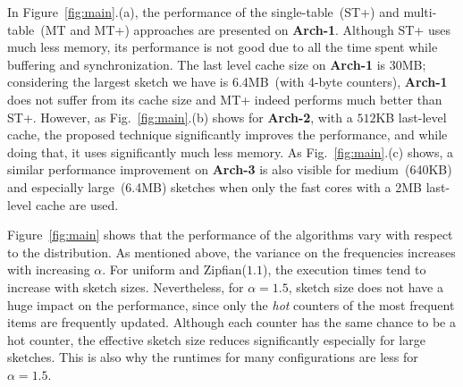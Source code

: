\documentclass[runningheads]{llncs}
\begin{document}
In Figure~\ref{fig:main}.(a), the performance of the single-table~(ST+) and multi-table~(MT and MT+) approaches are presented on {\bf Arch-1}. Although ST+ uses much less memory, its performance is not good due to all the time spent while buffering and synchronization. The last level cache size on  {\bf Arch-1} is 30MB; considering the largest sketch we have is 6.4MB~(with 4-byte counters), {\bf Arch-1} does not suffer from its cache size and MT+ indeed performs much better than ST+. However, as Fig.~\ref{fig:main}.(b) shows for {\bf Arch-2}, with a $512$KB last-level cache, the proposed technique significantly improves the performance, and while doing that, it uses significantly much less memory. As Fig.~\ref{fig:main}.(c) shows, a similar performance improvement on {\bf Arch-3} is also visible for medium~(640KB) and especially large~(6.4MB) sketches when only the fast cores with a 2MB last-level cache are used. 

Figure~\ref{fig:main} shows that the performance of the algorithms vary with respect to the distribution. As mentioned above, the variance on the frequencies increases with increasing $\alpha$. For uniform and Zipfian($1.1$), the execution times tend to increase with sketch sizes. Nevertheless, for $\alpha = 1.5$, sketch size does not have a huge impact on the performance, since only the {\em hot} counters of the most frequent items are frequently updated. Although each counter has the same chance to be a hot counter, the effective sketch size reduces significantly especially for large sketches. This is also why the runtimes for many configurations are less for $\alpha = 1.5$. 
\end{document}
